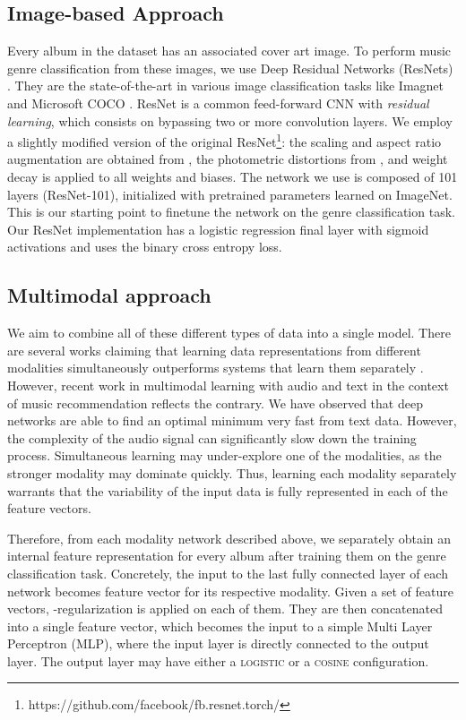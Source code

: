 \documentclass{article}
\begin{document}
\subsection{Image-based Approach}
\label{sec:resnet}
Every album in the dataset has an associated cover art image. To perform music genre classification from these images, we use Deep Residual Networks (ResNets) \cite{he2016deep}.
They are the state-of-the-art in various image classification tasks like Imagnet \cite{ILSVRC15} and Microsoft COCO \cite{lin2014microsoft}. 
ResNet is a common feed-forward CNN with \emph{residual learning}, which consists on bypassing two or more convolution layers. We employ a slightly modified version of the original ResNet\footnote{https://github.com/facebook/fb.resnet.torch/}: the scaling and aspect ratio augmentation are obtained from \cite{szegedy2015going}, the photometric distortions from \cite{howard2013some}, and weight decay is applied to all weights and biases. The network we use is composed of 101 layers (ResNet-101), initialized with pretrained parameters learned on ImageNet.
This is our starting point to finetune the network on the genre classification task.
Our ResNet implementation has a logistic regression final layer with sigmoid activations and uses the binary cross entropy loss.


\subsection{Multimodal approach}\label{sec:multimodal}

We aim to combine all of these different types of data into a single model.
There are several works claiming that learning data representations from different modalities simultaneously outperforms systems that learn them separately \cite{ngiam2011multimodal,dorfer2016towards}. However, recent work in multimodal learning with audio and text in the context of music recommendation \cite{Oramas2017} reflects the contrary. We have observed that deep networks are able to find an optimal minimum very fast from text data. However, the complexity of the audio signal can significantly slow down the training process. Simultaneous learning may under-explore one of the modalities, as the stronger modality may dominate quickly. Thus, learning each modality separately warrants that the variability of the input data is fully represented in each of the feature vectors.

Therefore, from each modality network described above, we separately obtain an internal feature representation for every album after training them on the genre classification task.
Concretely, the input to the last fully connected layer of each network becomes feature vector for its respective modality.
Given a set of feature vectors, -regularization is applied on each of them. 
They are then concatenated into a single feature vector, which becomes the input to a simple Multi Layer Perceptron (MLP), where the input layer is directly connected to the output layer. 
The output layer may have either a \textsc{logistic} or a \textsc{cosine} configuration. 
\end{document}
